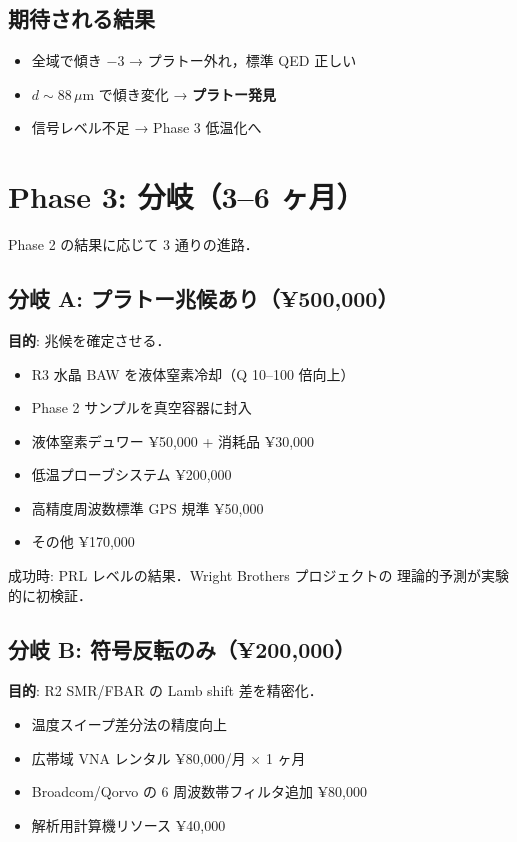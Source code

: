 \documentclass[11pt,a4paper]{article}
\begin{document}
\subsection{期待される結果}

\begin{itemize}
\item 全域で傾き $-3$ → プラトー外れ，標準 QED 正しい
\item $d \sim 88\,\mu$m で傾き変化 → \textbf{プラトー発見}
\item 信号レベル不足 → Phase 3 低温化へ
\end{itemize}

\section{Phase 3: 分岐（3--6 ヶ月）}

Phase 2 の結果に応じて 3 通りの進路．

\subsection{分岐 A: プラトー兆候あり（¥500,000）}

\textbf{目的}: 兆候を確定させる．

\begin{itemize}
\item R3 水晶 BAW を液体窒素冷却（Q 10--100 倍向上）
\item Phase 2 サンプルを真空容器に封入
\item 液体窒素デュワー ¥50,000 + 消耗品 ¥30,000
\item 低温プローブシステム ¥200,000
\item 高精度周波数標準 GPS 規準 ¥50,000
\item その他 ¥170,000
\end{itemize}

成功時: PRL レベルの結果．Wright Brothers プロジェクトの
理論的予測が実験的に初検証．

\subsection{分岐 B: 符号反転のみ（¥200,000）}

\textbf{目的}: R2 SMR/FBAR の Lamb shift 差を精密化．

\begin{itemize}
\item 温度スイープ差分法の精度向上
\item 広帯域 VNA レンタル ¥80,000/月 × 1 ヶ月
\item Broadcom/Qorvo の 6 周波数帯フィルタ追加 ¥80,000
\item 解析用計算機リソース ¥40,000
\end{itemize}
\end{document}

